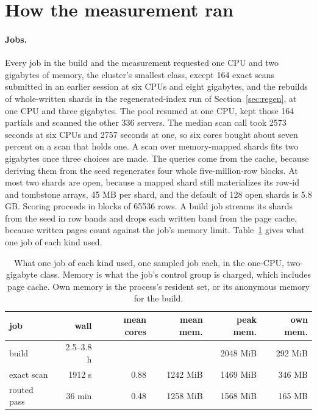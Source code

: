 \documentclass[sigconf, nonacm]{acmart}
\begin{document}
\section{How the measurement ran}
\label{sec:run}

\paragraph{Jobs.} Every job in the build and the measurement requested one CPU and two gigabytes
of memory, the cluster's smallest class, except 164 exact scans submitted in an earlier session
at six CPUs and eight gigabytes, and the rebuilds of whole-written shards in the regenerated-index
run of Section~\ref{sec:regen}, at one CPU and three gigabytes. The pool resumed at one CPU, kept those 164 partials and scanned
the other 336 servers. The median scan call took 2573 seconds at six CPUs and 2757 seconds at one,
so six cores bought about seven percent on a scan that holds one. A scan over memory-mapped shards fits two gigabytes once
three choices are made. The queries come from the cache, because deriving them from the seed
regenerates four whole five-million-row blocks. At most two shards are open, because a mapped shard
still materializes its row-id and tombstone arrays, 45 MB per shard, and the default of 128 open
shards is 5.8 GB. Scoring proceeds in blocks of 65536 rows. A build job streams its shards from
the seed in row bands and drops each written band from the page cache, because written pages count
against the job's memory limit. Table~\ref{tab:budget} gives what one job of each kind used.

\begin{table}[t]
\caption{What one job of each kind used, one sampled job each, in the one-CPU, two-gigabyte class.
Memory is what the job's control group is charged, which includes page cache. Own memory is the
process's resident set, or its anonymous memory for the build.}
\label{tab:budget}
\centering
\footnotesize
\setlength{\tabcolsep}{2.5pt}
\begin{tabular}{lrrrrr}
\toprule
job & wall & mean cores & mean mem. & peak mem. & own mem. \\
\midrule
build          & 2.5--3.8 h &      &          & 2048 MiB & 292 MiB \\
exact scan     & 1912 s     & 0.88 & 1242 MiB & 1469 MiB & 346 MB \\
routed pass    & 36 min     & 0.48 & 1258 MiB & 1568 MiB & 165 MB \\
\bottomrule
\end{tabular}
\end{table}
\end{document}
